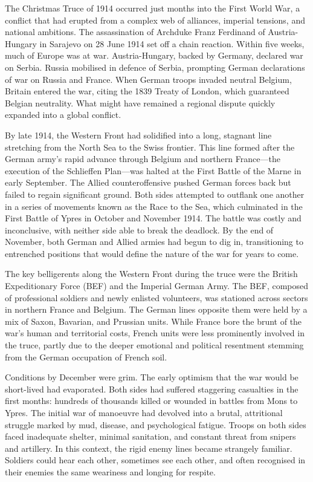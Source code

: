 \begin{historical}
The Christmas Truce of 1914 occurred just months into the First World War, a conflict that had erupted from a complex web of alliances, imperial tensions, and national ambitions. The assassination of Archduke Franz Ferdinand of Austria-Hungary in Sarajevo on 28 June 1914 set off a chain reaction. Within five weeks, much of Europe was at war. Austria-Hungary, backed by Germany, declared war on Serbia. Russia mobilised in defence of Serbia, prompting German declarations of war on Russia and France. When German troops invaded neutral Belgium, Britain entered the war, citing the 1839 Treaty of London, which guaranteed Belgian neutrality. What might have remained a regional dispute quickly expanded into a global conflict.

By late 1914, the Western Front had solidified into a long, stagnant line stretching from the North Sea to the Swiss frontier. This line formed after the German army’s rapid advance through Belgium and northern France—the execution of the Schlieffen Plan—was halted at the First Battle of the Marne in early September. The Allied counteroffensive pushed German forces back but failed to regain significant ground. Both sides attempted to outflank one another in a series of movements known as the \QSOpen{}Race to the Sea,\QSClose{} which culminated in the First Battle of Ypres in October and November 1914. The battle was costly and inconclusive, with neither side able to break the deadlock. By the end of November, both German and Allied armies had begun to dig in, transitioning to entrenched positions that would define the nature of the war for years to come.

The key belligerents along the Western Front during the truce were the British Expeditionary Force (BEF) and the Imperial German Army. The BEF, composed of professional soldiers and newly enlisted volunteers, was stationed across sectors in northern France and Belgium. The German lines opposite them were held by a mix of Saxon, Bavarian, and Prussian units. While France bore the brunt of the war’s human and territorial costs, French units were less prominently involved in the truce, partly due to the deeper emotional and political resentment stemming from the German occupation of French soil.

Conditions by December were grim. The early optimism that the war would be short-lived had evaporated. Both sides had suffered staggering casualties in the first months: hundreds of thousands killed or wounded in battles from Mons to Ypres. The initial war of manoeuvre had devolved into a brutal, attritional struggle marked by mud, disease, and psychological fatigue. Troops on both sides faced inadequate shelter, minimal sanitation, and constant threat from snipers and artillery. In this context, the rigid enemy lines became strangely familiar. Soldiers could hear each other, sometimes see each other, and often recognised in their enemies the same weariness and longing for respite.

\end{historical}